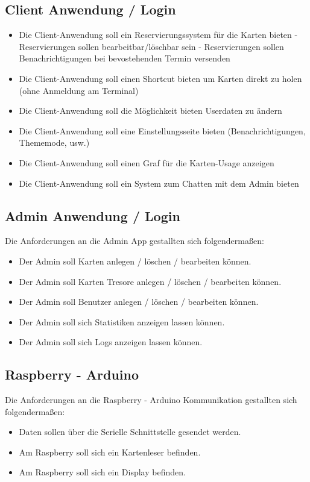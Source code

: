 \documentclass[a4paper]{article}
\begin{document}
\subsection{Client Anwendung / Login}
\begin{itemize}
    \item Die Client-Anwendung soll ein Reservierungssystem f\"ur die Karten bieten
    \subitem - Reservierungen sollen bearbeitbar/l\"oschbar sein
    \subitem - Reservierungen sollen Benachrichtigungen bei bevostehenden Termin versenden
    \item Die Client-Anwendung soll einen Shortcut bieten um Karten direkt zu holen (ohne Anmeldung am Terminal)
    \item Die Client-Anwendung soll die M\"oglichkeit bieten Userdaten zu \"andern
    \item Die Client-Anwendung soll eine Einstellungsseite bieten (Benachrichtigungen, Thememode, usw.)
    \item Die Client-Anwendung soll einen Graf f\"ur die Karten-Usage anzeigen
    \item Die Client-Anwendung soll ein System zum Chatten mit dem Admin bieten
\end{itemize}


\subsection{Admin Anwendung / Login}
Die Anforderungen an die Admin App gestallten sich folgendermaßen:
\begin{itemize}
  \item Der Admin soll Karten anlegen / löschen / bearbeiten können.
  \item Der Admin soll Karten Tresore anlegen / löschen / bearbeiten können.
  \item Der Admin soll Benutzer anlegen / löschen / bearbeiten können.
  \item Der Admin soll sich Statistiken anzeigen lassen können.
  \item Der Admin soll sich Logs anzeigen lassen können.
\end{itemize}


\subsection{Raspberry - Arduino}
Die Anforderungen an die Raspberry -  Arduino Kommunikation gestallten sich folgendermaßen:
\begin{itemize}
  \item Daten sollen über die Serielle Schnittstelle gesendet werden.
  \item Am Raspberry soll sich ein Kartenleser befinden.
  \item Am Raspberry soll sich ein Display befinden.
  
\end{itemize}
\end{document}
